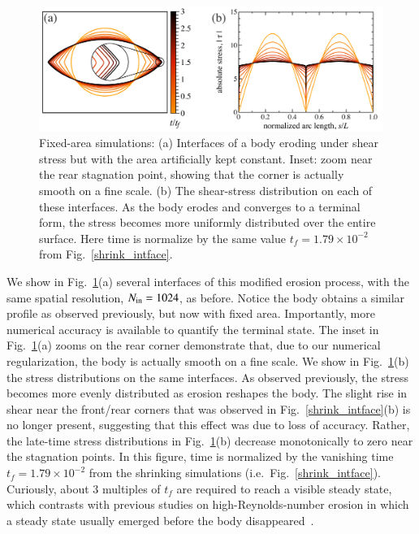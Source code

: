 \documentclass[preprint, 10pt]{elsarticle}
\begin{document}
\begin{figure}%
\begin{center}
\includegraphics[width = 0.85 \textwidth]{./figs/fixed_intface.pdf}
\caption{Fixed-area simulations: (a) Interfaces of a body eroding under shear stress but with the area artificially kept constant. Inset: zoom near the rear stagnation point, showing that the corner is actually smooth on a fine scale. (b) The shear-stress distribution on each of these interfaces. As the body erodes and converges to a terminal form, the stress becomes more uniformly distributed over the entire surface. Here time is normalize by the same value $t_f = 1.79 \times 10^{-2}$ from Fig.~\ref{shrink_intface}.}
\label{fixed_intface}
\end{center}
\end{figure}

	We show in Fig.~\ref{fixed_intface}(a) several interfaces of this modified erosion process, with the same spatial resolution, $N_{\mathrm{in}} = 1024$, as before. Notice the body obtains a similar profile as observed previously, but now with fixed area. Importantly, more numerical accuracy is available to quantify the terminal state. The inset in Fig.~\ref{fixed_intface}(a) zooms on the rear corner demonstrate that, due to our numerical regularization, the body is actually smooth on a fine scale. We show in Fig.~\ref{fixed_intface}(b) the stress distributions on the same interfaces. As observed previously, the stress becomes more evenly distributed as erosion reshapes the body. The slight rise in shear near the front/rear corners that was observed in Fig.~\ref{shrink_intface}(b) is no longer present, suggesting that this effect was due to loss of accuracy. Rather, the late-time stress distributions in Fig.~\ref{fixed_intface}(b) decrease monotonically to zero near the stagnation points. In this figure, time is normalized by the vanishing time $t_f = 1.79 \times 10^{-2}$ from the shrinking simulations (i.e.~Fig.~\ref{shrink_intface}). Curiously, about 3 multiples of $t_f$ are required to reach a visible steady state, which contrasts with previous studies on high-Reynolds-number erosion in which a steady state usually emerged before the body disappeared~\cite{moo-ris-chi-zha-she2013}.
\end{document}
